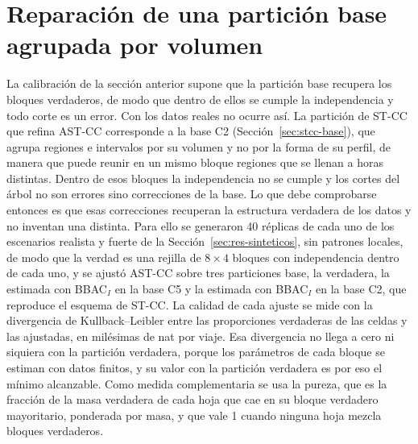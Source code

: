 \section{Reparación de una partición base agrupada por volumen}\label{sec:res-reparacion}

La calibración de la sección anterior supone que la partición base recupera los
bloques verdaderos, de modo que dentro de ellos se cumple la independencia y todo
corte es un error. Con los datos reales no ocurre así. La partición de ST-CC que
refina AST-CC corresponde a la base C2 (Sección~\ref{sec:stcc-base}), que agrupa
regiones e intervalos por su volumen y no por la forma de su perfil, de manera que
puede reunir en un mismo bloque regiones que se llenan a horas distintas. Dentro
de esos bloques la independencia no se cumple y los cortes del árbol no son
errores sino correcciones de la base. Lo que debe comprobarse entonces es que esas
correcciones recuperan la estructura verdadera de los datos y no inventan una
distinta. Para ello se generaron 40 réplicas de cada uno de los escenarios
realista y fuerte de la Sección~\ref{sec:res-sinteticos}, sin patrones locales,
de modo que la verdad es una rejilla de $8 \times 4$ bloques con independencia
dentro de cada uno, y se ajustó AST-CC sobre tres particiones base, la verdadera,
la estimada con BBAC$_I$ en la base C5 y la estimada con BBAC$_I$ en la base C2,
que reproduce el esquema de ST-CC. La calidad de cada ajuste se mide con la
divergencia de Kullback--Leibler entre las proporciones verdaderas de las celdas
y las ajustadas, en milésimas de nat por viaje. Esa divergencia no llega a cero
ni siquiera con la partición verdadera, porque los parámetros de cada bloque se
estiman con datos finitos, y su valor con la partición verdadera es por eso el
mínimo alcanzable. Como medida complementaria se usa la pureza, que es la
fracción de la masa verdadera de cada hoja que cae en su bloque verdadero
mayoritario, ponderada por masa, y que vale 1 cuando ninguna hoja mezcla bloques
verdaderos.

